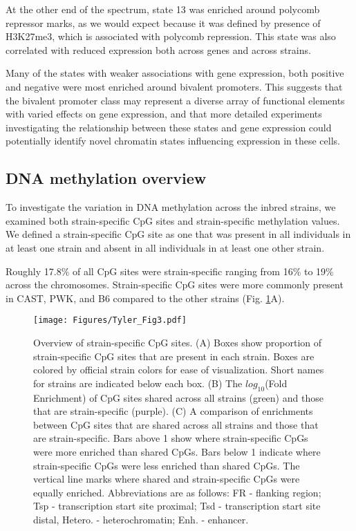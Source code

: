 \documentclass[
  11pt,
]{article}
\begin{document}
At the other end of the spectrum, state 13 was enriched around polycomb
repressor marks, as we would expect because it was defined by presence
of H3K27me3, which is associated with polycomb repression. This state
was also correlated with reduced expression both across genes and across
strains.

Many of the states with weaker associations with gene expression, both
positive and negative were most enriched around bivalent promoters. This
suggests that the bivalent promoter class may represent a diverse array
of functional elements with varied effects on gene expression, and that
more detailed experiments investigating the relationship between these
states and gene expression could potentially identify novel chromatin
states influencing expression in these cells.

\hypertarget{dna-methylation-overview}{%
\subsection{DNA methylation overview}\label{dna-methylation-overview}}

To investigate the variation in DNA methylation across the inbred
strains, we examined both strain-specific CpG sites and strain-specific
methylation values. We defined a strain-specific CpG site as one that
was present in all individuals in at least one strain and absent in all
individuals in at least one other strain.

Roughly 17.8\% of all CpG sites were strain-specific ranging from 16\%
to 19\% across the chromosomes. Strain-specific CpG sites were more
commonly present in CAST, PWK, and B6 compared to the other strains
(Fig. \ref{fig:cpg_overview}A).

\begin{figure}[ht!]
\begin{minipage}[c]{0.4\textwidth}
  \texttt{[image: Figures/Tyler\_Fig3.pdf]} 
\end{minipage}\hfill
\begin{minipage}[c]{0.5\textwidth}
\caption{Overview of strain-specific CpG sites. (A) Boxes 
show proportion of strain-specific CpG sites that are present 
in each strain. Boxes are colored by official strain colors
for ease of visualization. Short names for strains are
indicated below each box. (B) The $log_{10}$(Fold Enrichment)
of CpG sites shared across all strains (green) and those
that are strain-specific (purple). (C) A comparison
of enrichments between CpG sites that are shared across all 
strains and those that are strain-specific. Bars above 1
show where strain-specific CpGs were more enriched than 
shared CpGs. Bars below 1 indicate where strain-specific 
CpGs were less enriched than shared CpGs. The vertical 
line marks where shared and strain-specific CpGs were equally 
enriched. Abbreviations are as follows: FR - flanking region; 
Tsp - transcription start site proximal; Tsd - transcription
start site distal, Hetero. - heterochromatin; Enh. - enhancer.
}
\label{fig:cpg_overview}
\end{minipage}
\end{figure}
\end{document}
